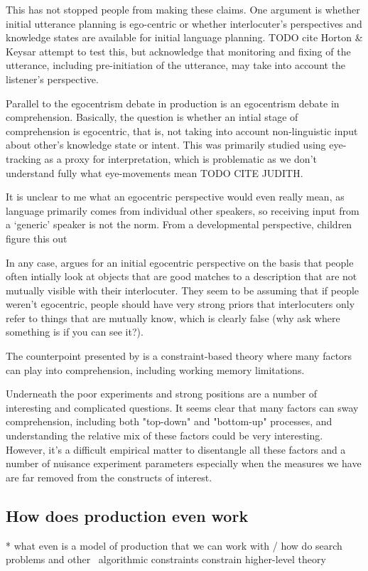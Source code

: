 \documentclass[]{article}
\begin{document}
This has not stopped people from making these claims. One argument is whether initial utterance planning is ego-centric or whether interlocuter's perspectives and knowledge states are available for initial language planning. TODO cite Horton \& Keysar attempt to test this, but acknowledge that monitoring and fixing of the utterance, including pre-initiation of the utterance, may take into account the listener's perspective. %

Parallel to the egocentrism debate in production is an egocentrism debate in comprehension. Basically, the question is whether an intial stage of comprehension is egocentric, that is, not taking into account non-linguistic input about other's knowledge state or intent. This was primarily studied using eye-tracking as a proxy for interpretation, which is problematic as we don't understand fully what eye-movements mean TODO CITE JUDITH. 

It is unclear to me what an egocentric perspective would even really mean, as language primarily comes from individual other speakers, so receiving input from a `generic' speaker is not the norm. From a developmental perspective, children figure this out %

In any case, \cite{keysar2000} argues for an initial egocentric perspective on the basis that people often intially look at objects that are good matches to a description that are not mutually visible with their interlocuter. They seem to be assuming that if people weren't egocentric, people should have very strong priors that interlocuters only refer to things that are mutually know, which is clearly false (why ask where something is if you can see it?). 

The counterpoint presented by \cite{hanna2003} is a constraint-based theory where many factors can play into comprehension, including working memory limitations. 

Underneath the poor experiments and strong positions are a number of interesting and complicated questions. It seems clear that many factors can sway comprehension, including both "top-down" and "bottom-up" processes, and understanding the relative mix of these factors could be very interesting. However, it's a difficult empirical matter to disentangle all these factors and a number of nuisance experiment parameters especially when the measures we have are far removed from the constructs of interest. 



\subsection{How does production even work}
* what even is a model of production that we can work with / how do search problems and other ~algorithmic constraints constrain higher-level theory
\end{document}
